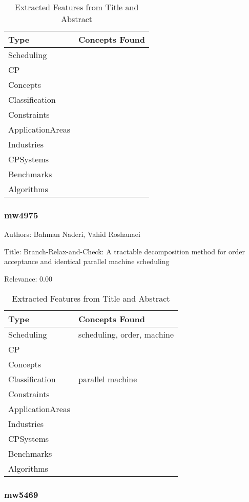 {\scriptsize
\begin{longtable}{p{2cm}p{20cm}}
\caption{Extracted Features from Title and Abstract}\\ \toprule
Type & Concepts Found\\ \midrule
\endhead
\bottomrule
\endfoot
Scheduling & \\ 
CP & \\ 
Concepts & \\ 
Classification & \\ 
Constraints & \\ 
ApplicationAreas & \\ 
Industries & \\ 
CPSystems & \\ 
Benchmarks & \\ 
Algorithms & \\ 
\end{longtable}
}



\subsubsection{mw4975}
\label{mw:mw4975}

Authors: Bahman Naderi, Vahid Roshanaei

Title: Branch-Relax-and-Check: A tractable decomposition method for order acceptance and identical parallel machine scheduling

Relevance:  0.00

{\scriptsize
\begin{longtable}{p{2cm}p{20cm}}
\caption{Extracted Features from Title and Abstract}\\ \toprule
Type & Concepts Found\\ \midrule
\endhead
\bottomrule
\endfoot
Scheduling & scheduling, order, machine\\ 
CP & \\ 
Concepts & \\ 
Classification & parallel machine\\ 
Constraints & \\ 
ApplicationAreas & \\ 
Industries & \\ 
CPSystems & \\ 
Benchmarks & \\ 
Algorithms & \\ 
\end{longtable}
}



\subsubsection{mw5469}
\label{mw:mw5469}

